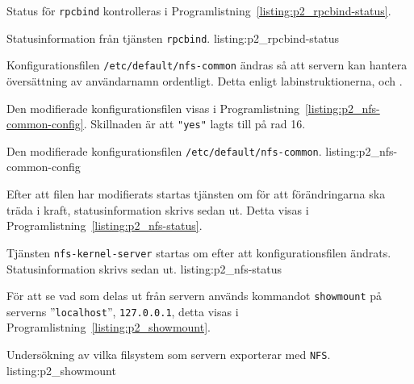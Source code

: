 Status för \texttt{rpcbind} kontrolleras i
Programlistning~\ref{listing:p2_rpcbind-status}.

            {Statusinformation från tjänsten \texttt{rpcbind}.}
            {listing:p2_rpcbind-status}


Konfigurationsfilen \texttt{/etc/default/nfs-common} ändras så att servern kan
hantera översättning av användarnamn ordentligt.
Detta enligt labinstruktionerna\cite{dvg001:instruktionerLab5},
\cite{ubuntu:NFSv4howto} och \cite{ubuntu:settingupNFShowto}.

Den modifierade konfigurationsfilen visas i
Programlistning~\ref{listing:p2_nfs-common-config}.
Skillnaden är att \texttt{"yes"} lagts till på rad 16.

            {Den modifierade konfigurationsfilen \texttt{/etc/default/nfs-common}.}
            {listing:p2_nfs-common-config}


Efter att filen har modifierats startas tjänsten om för att förändringarna
ska träda i kraft, statusinformation skrivs sedan ut. Detta visas i
Programlistning~\ref{listing:p2_nfs-status}.

            {Tjänsten \texttt{nfs-kernel-server} startas om efter att
             konfigurationsfilen ändrats. Statusinformation skrivs sedan ut.}
            {listing:p2_nfs-status}


För att se vad som delas ut från servern används kommandot \texttt{showmount}
på serverns ''\texttt{localhost}'', \texttt{127.0.0.1}, detta visas i 
Programlistning~\ref{listing:p2_showmount}.

            {Undersökning av vilka filsystem som servern exporterar med 
             \texttt{NFS}.}
            {listing:p2_showmount}
